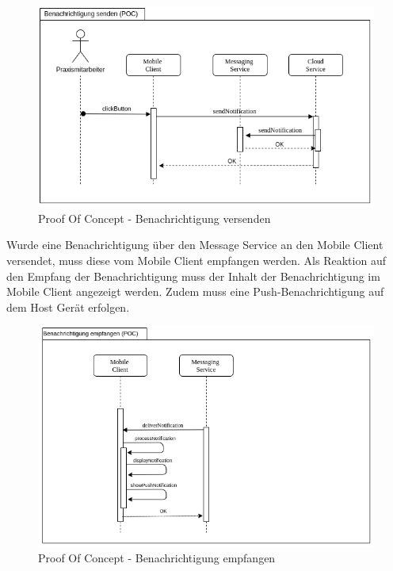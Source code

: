 \begin{figure}[h]
    \centering
    \begin{minipage}[b]{1.0\textwidth}
        \includegraphics[width=\textwidth]{graphics/Sequence_POC_Send}
        \caption{Proof Of Concept - Benachrichtigung versenden}
    \end{minipage}
\end{figure}

\clearpage

Wurde eine Benachrichtigung über den Message Service an den Mobile Client versendet, muss diese vom Mobile Client empfangen werden.
Als Reaktion auf den Empfang der Benachrichtigung muss der Inhalt der Benachrichtigung im Mobile Client angezeigt werden.
Zudem muss eine Push-Benachrichtigung auf dem Host Gerät erfolgen.

\begin{figure}[h]
    \centering
    \begin{minipage}[b]{1.0\textwidth}
        \includegraphics[width=\textwidth]{graphics/Sequence_POC_Receive}
        \caption{Proof Of Concept - Benachrichtigung empfangen}
    \end{minipage}
\end{figure}

\clearpage

